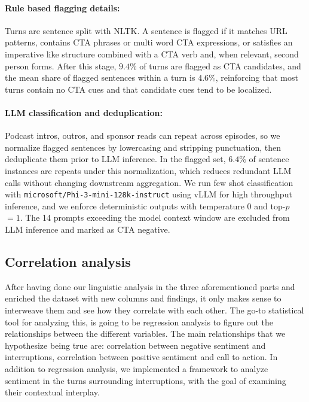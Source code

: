 \documentclass{article}
\begin{document}
\paragraph{Rule based flagging details:}
Turns are sentence split with NLTK. A sentence is flagged if it matches URL patterns, contains CTA phrases or multi word CTA expressions, or satisfies an imperative like structure combined with a CTA verb and, when relevant, second person forms. After this stage, $9.4\%$ of turns are flagged as CTA candidates, and the mean share of flagged sentences within a turn is $4.6\%$, reinforcing that most turns contain no CTA cues and that candidate cues tend to be localized.

\paragraph{LLM classification and deduplication:}
Podcast intros, outros, and sponsor reads can repeat across episodes, so we normalize flagged sentences by lowercasing and stripping punctuation, then deduplicate them prior to LLM inference. In the flagged set, $6.4\%$ of sentence instances are repeats under this normalization, which reduces redundant LLM calls without changing downstream aggregation. We run few shot classification with \texttt{microsoft/Phi-3-mini-128k-instruct} \cite{abdin2024phi3technicalreporthighly} using vLLM for high throughput inference, and we enforce deterministic outputs with temperature $0$ and top-$p$ $= 1$. The 14 prompts exceeding the model context window are excluded from LLM inference and marked as CTA negative.

\subsection{Correlation analysis}

After having done our linguistic analysis in the three aforementioned parts and enriched the dataset with new columns and findings, it only makes sense to interweave them and see how they correlate with each other. The go-to statistical tool for analyzing this, is going to be regression analysis to figure out the relationships between the different variables. The main relationships that we hypothesize being true are: correlation between negative sentiment and interruptions, correlation between positive sentiment and call to action. In addition to regression analysis, we implemented a framework to analyze sentiment in the turns surrounding interruptions, with the goal of examining their contextual interplay.
\end{document}

